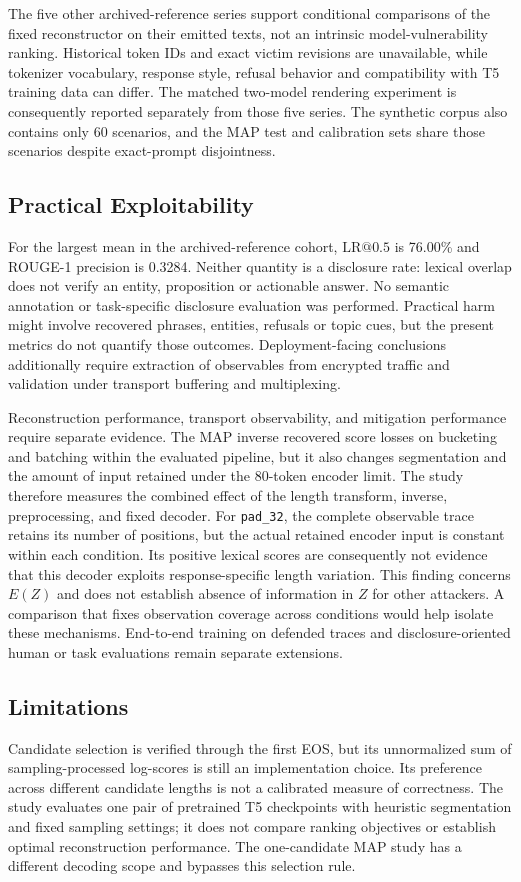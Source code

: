 \documentclass[electronics,article,submit,pdftex,moreauthors]{Definitions/mdpi}
\begin{document}
The five other archived-reference series support conditional comparisons of the fixed reconstructor on their emitted texts, not an intrinsic model-vulnerability ranking. Historical token IDs and exact victim revisions are unavailable, while tokenizer vocabulary, response style, refusal behavior and compatibility with T5 training data can differ. The matched two-model rendering experiment is consequently reported separately from those five series. The synthetic corpus also contains only 60 scenarios, and the MAP test and calibration sets share those scenarios despite exact-prompt disjointness.

\subsection{Practical Exploitability}
For the largest mean in the archived-reference cohort, $\mathrm{LR}@0.5$ is 76.00\% and ROUGE-1 precision is 0.3284. Neither quantity is a disclosure rate: lexical overlap does not verify an entity, proposition or actionable answer. No semantic annotation or task-specific disclosure evaluation was performed. Practical harm might involve recovered phrases, entities, refusals or topic cues, but the present metrics do not quantify those outcomes. Deployment-facing conclusions additionally require extraction of observables from encrypted traffic and validation under transport buffering and multiplexing.

Reconstruction performance, transport observability, and mitigation performance require separate evidence. The MAP inverse recovered score losses on bucketing and batching within the evaluated pipeline, but it also changes segmentation and the amount of input retained under the 80-token encoder limit. The study therefore measures the combined effect of the length transform, inverse, preprocessing, and fixed decoder. For \texttt{pad\_32}, the complete observable trace retains its number of positions, but the actual retained encoder input is constant within each condition. Its positive lexical scores are consequently not evidence that this decoder exploits response-specific length variation. This finding concerns $E(Z)$ and does not establish absence of information in $Z$ for other attackers. A comparison that fixes observation coverage across conditions would help isolate these mechanisms. End-to-end training on defended traces and disclosure-oriented human or task evaluations remain separate extensions.

\subsection{Limitations}
Candidate selection is verified through the first EOS, but its unnormalized sum of sampling-processed log-scores is still an implementation choice. Its preference across different candidate lengths is not a calibrated measure of correctness. The study evaluates one pair of pretrained T5 checkpoints with heuristic segmentation and fixed sampling settings; it does not compare ranking objectives or establish optimal reconstruction performance. The one-candidate MAP study has a different decoding scope and bypasses this selection rule.
\end{document}
